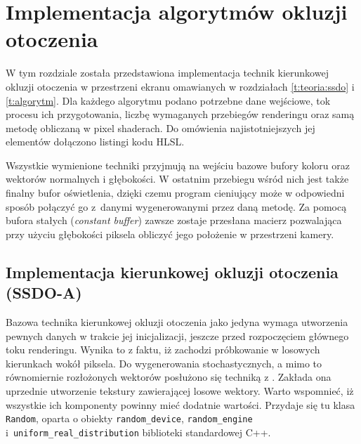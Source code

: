 \chapter{Implementacja algorytmów okluzji otoczenia}
\label{t:impl}

	
	W tym rozdziale została przedstawiona implementacja technik kierunkowej okluzji otoczenia w przestrzeni ekranu omawianych w rozdziałach \ref{t:teoria:ssdo} i \ref{t:algorytm}. Dla każdego algorytmu podano potrzebne dane wejściowe, tok procesu ich przygotowania, liczbę wymaganych przebiegów renderingu oraz samą metodę obliczaną w pixel shaderach. Do omówienia najistotniejszych jej elementów dołączono listingi kodu HLSL.
	
	Wszystkie wymienione techniki przyjmują na wejściu bazowe bufory koloru oraz wektorów normalnych i głębokości. W ostatnim przebiegu wśród nich jest także finalny bufor oświetlenia, dzięki czemu program cieniujący może w odpowiedni sposób połączyć go z~danymi wygenerowanymi przez daną metodę. Za pomocą bufora stałych (\emph{constant buffer}) zawsze zostaje przesłana macierz pozwalająca przy użyciu głębokości piksela obliczyć jego położenie w przestrzeni kamery.
	
	\section{Implementacja kierunkowej okluzji otoczenia (SSDO-A)}
	\label{t:impl:a}
	
	
	
	Bazowa technika kierunkowej okluzji otoczenia jako jedyna wymaga utworzenia pewnych danych w trakcie jej inicjalizacji, jeszcze przed rozpoczęciem głównego toku renderingu. Wynika to z faktu, iż zachodzi próbkowanie w losowych kierunkach wokół piksela. Do wygenerowania stochastycznych, a mimo to równomiernie rozłożonych wektorów posłużono się techniką z \cite{luna}. Zakłada ona uprzednie utworzenie tekstury zawierającej losowe wektory. Warto wspomnieć, iż wszystkie ich komponenty powinny mieć dodatnie wartości. Przydaje się tu klasa \texttt{Random}, oparta o obiekty \texttt{random\_device}, \texttt{random\_engine} i~\texttt{uniform\_real\_distribution} biblioteki standardowej C++.
	
